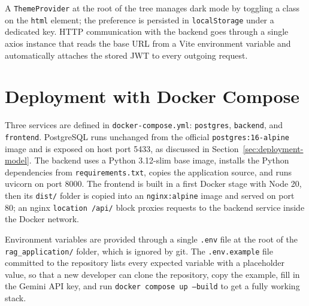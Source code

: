 A \texttt{ThemeProvider} at the root of the tree manages dark mode by
toggling a class on the \texttt{html} element; the preference is
persisted in \texttt{localStorage} under a dedicated key. HTTP
communication with the backend goes through a single axios instance
that reads the base URL from a Vite environment variable and
automatically attaches the stored JWT to every outgoing request.

\section{Deployment with Docker Compose}
\label{sec:deployment-impl}

Three services are defined in \texttt{docker-compose.yml}:
\texttt{postgres}, \texttt{backend}, and \texttt{frontend}. PostgreSQL
runs unchanged from the official \texttt{postgres:16-alpine} image and
is exposed on host port 5433, as discussed in
Section~\ref{sec:deployment-model}. The backend uses a Python 3.12-slim
base image, installs the Python dependencies from
\texttt{requirements.txt}, copies the application source, and runs
uvicorn on port 8000. The frontend is built in a first Docker stage
with Node 20, then its \texttt{dist/} folder is copied into an
\texttt{nginx:alpine} image and served on port 80; an nginx
\texttt{location /api/} block proxies requests to the backend service
inside the Docker network.

Environment variables are provided through a single \texttt{.env} file
at the root of the \texttt{rag\_application/} folder, which is ignored
by git. The \texttt{.env.example} file committed to the repository
lists every expected variable with a placeholder value, so that a new
developer can clone the repository, copy the example, fill in the
Gemini API key, and run \texttt{docker compose up --build} to get a
fully working stack.
